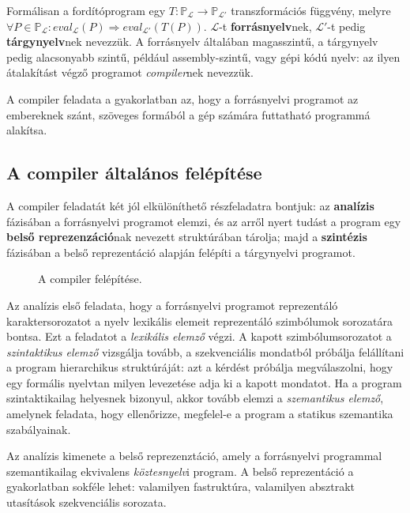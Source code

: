 
Formálisan a fordítóprogram egy $T: \mathbb{P}_\mathcal{L} \rightarrow \mathbb{P}_{\mathcal{L}'}$ transzformációs függvény, melyre $\forall P \in \mathbb{P}_\mathcal{L}: eval_\mathcal{L}(P) \Rightarrow eval_{\mathcal{L}'}(T(P))$.
$\mathcal{L}$-t \textbf{forrásnyelv}nek, $\mathcal{L}'$-t pedig \textbf{tárgynyelv}nek nevezzük.
A forrásnyelv általában magasszintű, a tárgynyelv pedig alacsonyabb szintű, például assembly-szintű, vagy gépi kódú nyelv: az ilyen átalakítást végző programot \textit{compiler}nek nevezzük\cite{Csornyei}.

A compiler feladata a gyakorlatban az, hogy a forrásnyelvi programot az embereknek szánt, szöveges formából a gép számára futtatható programmá alakítsa.

\subsection{A compiler általános felépítése}
A compiler feladatát két jól elkülöníthető részfeladatra bontjuk: az \textbf{analízis} fázisában a forrásnyelvi programot elemzi, és az arről nyert tudást a program egy \textbf{belső reprezenzáció}nak nevezett struktúrában tárolja; majd a \textbf{szintézis} fázisában a belső reprezentáció alapján felépíti a tárgynyelvi programot\cite{Csornyei}\cite{torczon_cooper}.

\begin{figure}[htb]
	\centering
	\resizebox{\textwidth}{!}{}
	\caption{A compiler felépítése.}
\end{figure}

Az analízis első feladata, hogy a forrásnyelvi programot reprezentáló karaktersorozatot a nyelv lexikális elemeit reprezentáló szimbólumok sorozatára bontsa.
Ezt a feladatot a \textit{lexikális elemző} végzi.
A kapott szimbólumsorozatot a \textit{szintaktikus elemző} vizsgálja tovább, a szekvenciális mondatból próbálja felállítani a program hierarchikus struktúráját: azt a kérdést próbálja megválaszolni, hogy egy formális nyelvtan milyen levezetése adja ki a kapott mondatot.
Ha a program szintaktikailag helyesnek bizonyul, akkor tovább elemzi a \textit{szemantikus elemző}, amelynek feladata, hogy ellenőrizze, megfelel-e a program a statikus szemantika szabályainak.

Az analízis kimenete a belső reprezenztáció, amely a forrásnyelvi programmal szemantikailag ekvivalens \textit{köztesnyelv}i program.
A belső reprezentáció a gyakorlatban sokféle lehet: valamilyen fastruktúra, valamilyen absztrakt utasítások szekvenciális sorozata.\cite{torczon_cooper}

